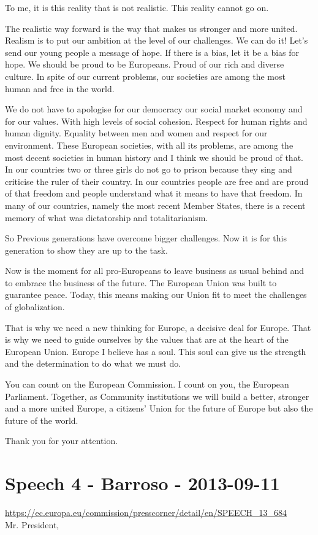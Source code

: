 \documentclass[a4paper,11pt]{article}
\begin{document}
To me, it is this reality that is not realistic. This reality cannot go on.

The realistic way forward is the way that makes us stronger and more united. Realism is to put our ambition at the level of our challenges. We can do it! Let's send our young people a message of hope. If there is a bias, let it be a bias for hope. We should be proud to be Europeans. Proud of our rich and diverse culture. In spite of our current problems, our societies are among the most human and free in the world.

We do not have to apologise for our democracy our social market economy and for our values. With high levels of social cohesion. Respect for human rights and human dignity. Equality between men and women and respect for our environment. These European societies, with all its problems, are among the most decent societies in human history and I think we should be proud of that. In our countries two or three girls do not go to prison because they sing and criticise the ruler of their country. In our countries people are free and are proud of that freedom and people understand what it means to have that freedom. In many of our countries, namely the most recent Member States, there is a recent memory of what was dictatorship and totalitarianism.

So Previous generations have overcome bigger challenges. Now it is for this generation to show they are up to the task.

Now is the moment for all pro-Europeans to leave business as usual behind and to embrace the business of the future. The European Union was built to guarantee peace. Today, this means making our Union fit to meet the challenges of globalization.

That is why we need a new thinking for Europe, a decisive deal for Europe. That is why we need to guide ourselves by the values that are at the heart of the European Union. Europe I believe has a soul. This soul can give us the strength and the determination to do what we must do.

You can count on the European Commission. I count on you, the European Parliament. Together, as Community institutions we will build a better, stronger and a more united Europe, a citizens' Union for the future of Europe but also the future of the world.

Thank you for your attention.
 \newpage\section{Speech 4 - Barroso - 2013-09-11}
\url{https://ec.europa.eu/commission/presscorner/detail/en/SPEECH_13_684}\\[3mm]
Mr. President,
\end{document}
